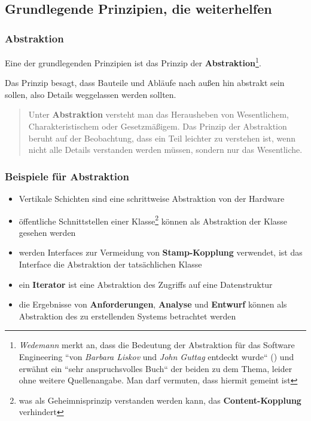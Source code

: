 \subsection{Grundlegende Prinzipien, die weiterhelfen}

\subsubsection*{Abstraktion}
Eine der grundlegenden Prinzipien ist das Prinzip der \textbf{Abstraktion}\footnote{
\textit{Wedemann} merkt an, dass die Bedeutung der Abstraktion für das Software Engineering ``von \textit{Barbara Liskov} und \textit{John Guttag} entdeckt wurde`` (\cite[75, Hervorhebung eigene]{Wed09b}) und erwähnt ein ``sehr anspruchsvolles Buch`` der beiden zu dem Thema, leider ohne weitere Quellenangabe. Man darf vermuten, dass hiermit \cite{LG00} gemeint ist
}.

\noindent
Das Prinzip besagt, dass Bauteile und Abläufe nach außen hin abstrakt sein sollen, also Details weggelassen werden sollten.

\vspace{2mm}
\begin{tcolorbox}[title=Abstraktion]
    \blockquote[{\cite[75, Hervorhebung eigene]{Wed09b}}]{
        Unter \textbf{Abstraktion} versteht man das Herausheben von Wesentlichem, Charakteristischem oder Gesetzmäßigem. Das Prinzip der Abstraktion beruht auf der Beobachtung, dass ein Teil leichter zu verstehen ist, wenn nicht alle Details verstanden werden müssen, sondern nur das Wesentliche.
    }
\end{tcolorbox}
\vspace{2mm}

\subsubsection*{Beispiele für Abstraktion}
\begin{itemize}
    \item Vertikale Schichten sind eine schrittweise Abstraktion von der Hardware
    \item öffentliche Schnittstellen einer Klasse\footnote{
        was als Geheimnisprinzip verstanden werden kann, das \textbf{Content-Kopplung} verhindert
    } können als Abstraktion der Klasse gesehen werden
    \item werden Interfaces zur Vermeidung von \textbf{Stamp-Kopplung} verwendet, ist das Interface die Abstraktion der tatsächlichen Klasse
    \item ein \textbf{Iterator} ist eine Abstraktion des Zugriffs auf eine Datenstruktur
    \item die Ergebnisse von \textbf{Anforderungen}, \textbf{Analyse} und \textbf{Entwurf} können als Abstraktion des zu erstellenden Systems betrachtet werden
\end{itemize}


